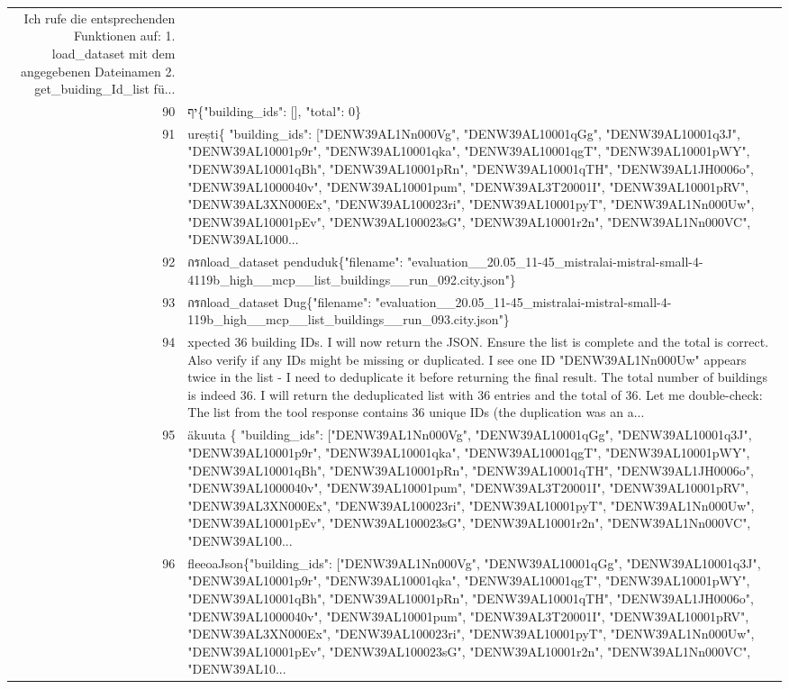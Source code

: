 \documentclass[a4paper,11pt]{article}
\begin{document}
\begin{table}[ht]
\begin{tabular}{r p{12cm}}
Ich rufe die entsprechenden Funktionen auf:
1. load\_dataset mit dem angegebenen Dateinamen
2. get\_buiding\_Id\_list fü... \\
90 & יף\{"building\_ids": [], "total": 0\} \\
91 & urești\{
  "building\_ids": ["DENW39AL1Nn000Vg", "DENW39AL10001qGg", "DENW39AL10001q3J", "DENW39AL10001p9r", "DENW39AL10001qka", "DENW39AL10001qgT", "DENW39AL10001pWY", "DENW39AL10001qBh", "DENW39AL10001pRn", "DENW39AL10001qTH", "DENW39AL1JH0006o", "DENW39AL1000040v", "DENW39AL10001pum", "DENW39AL3T20001I", "DENW39AL10001pRV", "DENW39AL3XN000Ex", "DENW39AL100023ri", "DENW39AL10001pyT", "DENW39AL1Nn000Uw", "DENW39AL10001pEv", "DENW39AL100023sG", "DENW39AL10001r2n", "DENW39AL1Nn000VC", "DENW39AL1000... \\
92 &  กรกload\_dataset penduduk\{"filename": "evaluation\_\_20.05\_11-45\_mistralai-mistral-small-4-4119b\_high\_\_mcp\_\_list\_buildings\_\_run\_092.city.json"\} \\
93 &  กรกload\_dataset Dug\{"filename": "evaluation\_\_20.05\_11-45\_mistralai-mistral-small-4-119b\_high\_\_mcp\_\_list\_buildings\_\_run\_093.city.json"\} \\
94 & xpected 36 building IDs. I will now return the JSON. Ensure the list is complete and the total is correct. Also verify if any IDs might be missing or duplicated. I see one ID "DENW39AL1Nn000Uw" appears twice in the list - I need to deduplicate it before returning the final result. The total number of buildings is indeed 36. I will return the deduplicated list with 36 entries and the total of 36. Let me double-check: The list from the tool response contains 36 unique IDs (the duplication was an a... \\
95 & äkuuta
\{
  "building\_ids": ["DENW39AL1Nn000Vg", "DENW39AL10001qGg", "DENW39AL10001q3J", "DENW39AL10001p9r", "DENW39AL10001qka", "DENW39AL10001qgT", "DENW39AL10001pWY", "DENW39AL10001qBh", "DENW39AL10001pRn", "DENW39AL10001qTH", "DENW39AL1JH0006o", "DENW39AL1000040v", "DENW39AL10001pum", "DENW39AL3T20001I", "DENW39AL10001pRV", "DENW39AL3XN000Ex", "DENW39AL100023ri", "DENW39AL10001pyT", "DENW39AL1Nn000Uw", "DENW39AL10001pEv", "DENW39AL100023sG", "DENW39AL10001r2n", "DENW39AL1Nn000VC", "DENW39AL100... \\
96 &  fleeoaJson\{"building\_ids": ["DENW39AL1Nn000Vg", "DENW39AL10001qGg", "DENW39AL10001q3J", "DENW39AL10001p9r", "DENW39AL10001qka", "DENW39AL10001qgT", "DENW39AL10001pWY", "DENW39AL10001qBh", "DENW39AL10001pRn", "DENW39AL10001qTH", "DENW39AL1JH0006o", "DENW39AL1000040v", "DENW39AL10001pum", "DENW39AL3T20001I", "DENW39AL10001pRV", "DENW39AL3XN000Ex", "DENW39AL100023ri", "DENW39AL10001pyT", "DENW39AL1Nn000Uw", "DENW39AL10001pEv", "DENW39AL100023sG", "DENW39AL10001r2n", "DENW39AL1Nn000VC", "DENW39AL10... \\

\end{tabular}
\end{table}
\end{document}
